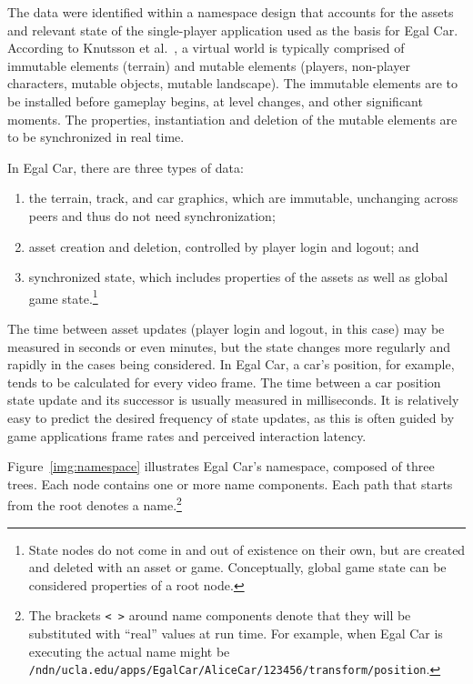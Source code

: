 \documentclass{article}
\begin{document}
The data were identified within a namespace design that accounts for the assets and relevant state of the single-player application used as the basis for Egal Car.  According to Knutsson et al.~\cite{Upen}, a virtual world is typically comprised of immutable elements (terrain) and mutable elements (players, non-player characters, mutable objects, mutable landscape). The immutable elements are to be installed before gameplay begins, at level changes, and other significant moments. The properties, instantiation and deletion of the mutable elements are to be synchronized in real time. 

In Egal Car, there are three types of data: 
\begin{enumerate}
\item the terrain, track, and car graphics, which are immutable, unchanging across peers and thus do not need synchronization;  
\item asset creation and deletion, controlled by player login and logout; and 
\item synchronized state, which includes properties of the assets as well as global game state.\footnote{State nodes do not come in and out of existence on their own, but are created and deleted with an asset or game.  Conceptually, global game state can be considered properties of a root node.}  
\end{enumerate}
The time between asset updates (player login and logout, in this case) may be measured in seconds or even minutes, but the state changes more regularly and rapidly in the cases being considered. In Egal Car, a car's position, for example, tends to be calculated for every video frame. The time between a car position state update and its successor is usually measured in milliseconds. It is relatively easy to predict the desired frequency of state updates, as this is often guided by game applications frame rates and perceived interaction latency.

Figure~\ref{img:namespace} illustrates Egal Car's namespace, composed of three trees. Each node contains one or more name components. Each path that starts from the root denotes a name.\footnote{The brackets \texttt{< >} around name components denote that they will be substituted with ``real'' values at run time. For example, when Egal Car is executing the actual name might be \texttt{/ndn/ucla.edu/apps/EgalCar/AliceCar/123456/transform/position}.}
\end{document}
